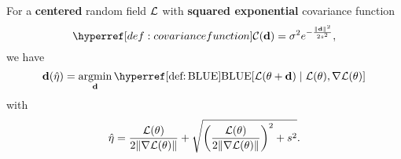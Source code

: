
\begin{theorem}
	For a \textbf{centered} random field \(\mathcal{L}\) with \textbf{squared exponential}
	covariance function
	\[
		\C(\step) = \sigma^2 e^{-\frac{\|\step\|^2}{2\scale^2}},
	\]
	we have
	\begin{equation*}
		\step(\hat{\lr})
		= \argmin_{\step} \BLUE[\Loss(\param + \step)\mid \Loss(\param),\grad\Loss(\param)]
	\end{equation*}	
	with
	\begin{equation*}
		\hat{\eta}
		= \frac{\mathcal{L}(\theta)}{2\|\nabla\mathcal{L}(\theta)\|}
		+ \sqrt{
			\left(\frac{\mathcal{L}(\theta)}{2\|\nabla\mathcal{L}(\theta)\|}\right)^2 + s^2 
		}.
	\end{equation*}
\end{theorem}
